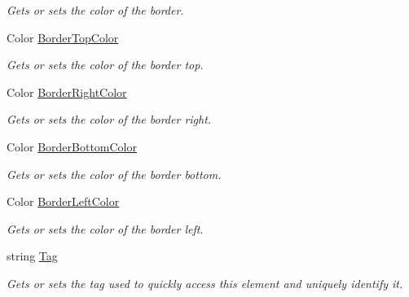 \begin{DoxyCompactItemize}
\begin{DoxyCompactList}\small\item\em Gets or sets the color of the border. \end{DoxyCompactList}\item 
Color \hyperlink{class_m_b2_d_1_1_u_i_1_1_u_i_element_aa45f78b02d01b2dbec6b4fc217931893}{Border\+Top\+Color}
\begin{DoxyCompactList}\small\item\em Gets or sets the color of the border top. \end{DoxyCompactList}\item 
Color \hyperlink{class_m_b2_d_1_1_u_i_1_1_u_i_element_ad9ccf8afb8798ad432e3e08872101bf4}{Border\+Right\+Color}
\begin{DoxyCompactList}\small\item\em Gets or sets the color of the border right. \end{DoxyCompactList}\item 
Color \hyperlink{class_m_b2_d_1_1_u_i_1_1_u_i_element_af5fa3d6d3757bfe0a8d5ddd03d897c6c}{Border\+Bottom\+Color}
\begin{DoxyCompactList}\small\item\em Gets or sets the color of the border bottom. \end{DoxyCompactList}\item 
Color \hyperlink{class_m_b2_d_1_1_u_i_1_1_u_i_element_aef07fe4fd9fef08485aa7265f4b9128b}{Border\+Left\+Color}
\begin{DoxyCompactList}\small\item\em Gets or sets the color of the border left. \end{DoxyCompactList}\item 
string \hyperlink{class_m_b2_d_1_1_u_i_1_1_u_i_element_a6cb084698047528460e9c56690307f2c}{Tag}
\begin{DoxyCompactList}\small\item\em Gets or sets the tag used to quickly access this element and uniquely identify it. \end{DoxyCompactList}\end{DoxyCompactItemize}


